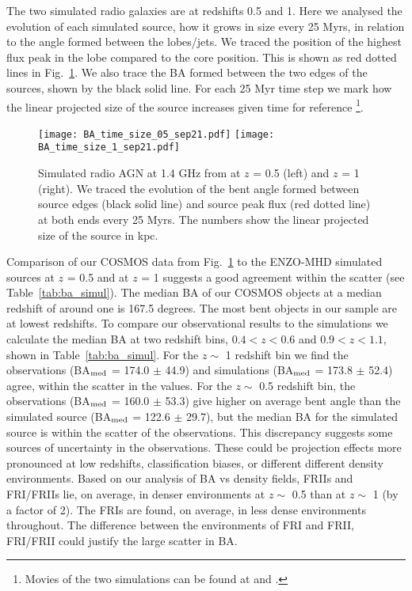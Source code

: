 \documentclass[galaxies,article,submit,moreauthors,pdftex]{Definitions/mdpi}
\begin{document}
The two simulated radio galaxies are at redshifts 0.5 and 1. Here we analysed the evolution of each simulated source, how it grows in size every 25 Myrs, in relation to the angle formed between the lobes/jets. We traced the position of the highest flux peak in the lobe compared to the core position. This is shown as red dotted lines in Fig.~\ref{fig:bent_sim_vaz}. We also trace the BA formed between the two edges of the sources, shown by the black solid line. For each 25 Myr time step we mark how the linear projected size of the source increases given time for reference  \footnote{Movies of the two simulations can be found at  and .}.
  
    \begin{figure}[!ht]
  \resizebox{\hsize}{!}
 {\texttt{[image: BA\_time\_size\_05\_sep21.pdf]}
 \texttt{[image: BA\_time\_size\_1\_sep21.pdf]}}

                 
       \caption{Simulated radio AGN at 1.4 GHz from \cite{vazza21} at $z$ = 0.5 (left) and $z$ = 1 (right). We traced the evolution of the bent angle formed between source edges (black solid line) and source peak flux (red dotted line) at both ends every 25 Myrs. The numbers show the linear projected size of the source in kpc.  
   }
              \label{fig:bent_sim_vaz}%
    \end{figure}
    
Comparison of our COSMOS data from Fig.~\ref{fig:bent_sim_vaz} to the ENZO-MHD simulated sources at $z$ = 0.5 and at $z$ = 1 suggests a good agreement within the scatter (see Table~\ref{tab:ba_simul}). The median BA of our COSMOS objects at a median redshift of around one is 167.5 degrees. The most bent objects in our sample are at lowest redshifts. To compare our observational results to the simulations we calculate the median BA at two redshift bins, $0.4 < z < 0.6$ and $0.9 < z < 1.1$, shown in Table~\ref{tab:ba_simul}. For the $z \sim$ 1 redshift bin we find the observations (BA$_{\rm med}$ =  174.0 $\pm$ 44.9) and simulations (BA$_{\rm med}$ =  173.8 $\pm$ 52.4) agree, within the scatter in the values. For the $z \sim$ 0.5 redshift bin, the observations (BA$_{\rm med}$ =  160.0 $\pm$ 53.3) give higher on average bent angle than the simulated source (BA$_{\rm med}$ = 122.6 $\pm$ 29.7), but the median BA for the simulated source is within the scatter of the observations. This discrepancy suggests some sources of uncertainty in the observations. These could be projection effects more pronounced at low redshifts, classification biases, or different different density environments. Based on our analysis of BA vs density fields, FRIIs and FRI/FRIIs lie, on average, in denser environments at $z \sim$ 0.5 than at $z \sim$ 1 (by a factor of 2). The FRIs are found, on average, in less dense environments throughout. The difference between the environments of FRI and FRII, FRI/FRII could justify the large scatter in BA.
\end{document}
